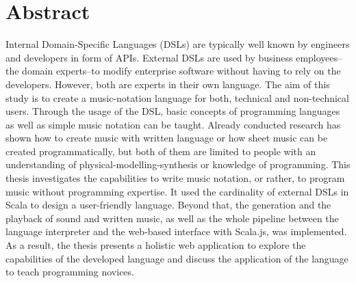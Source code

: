 \chapter*{Abstract}

Internal Domain-Specific Languages (DSLs) are typically well known by engineers and developers in form of APIs. External DSLs are used by business employees–the domain experts–to modify enterprise software without having to rely on the developers. However, both are experts in their own language.
The aim of this study is to create a music-notation language for both, technical and non-technical users. Through the usage of the DSL, basic concepts of programming languages as well as simple music notation can be taught.
Already conducted research has shown how to create music with written language or how sheet music can be created programmatically, but both of them are limited to people with an understanding of physical-modelling-synthesis or knowledge of programming.
This thesis investigates the capabilities to write music notation, or rather, to program music without programming expertise.
It used the cardinality of external DSLs in Scala to design a user-friendly language.
Beyond that, the generation and the playback of sound and written music, as well as the whole pipeline between the language interpreter and the web-based interface with Scala.js, was implemented.
As a result, the thesis presents a holistic web application to explore the capabilities of the developed language and discuss the application of the language to teach programming novices.
